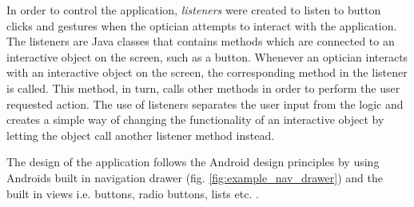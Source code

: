 \documentclass[12pt,a4paper,notitlepage]{report}
\begin{document}
In order to control the application, \textit{listeners} were created to listen to button clicks and gestures when the optician attempts to interact with the application. The listeners are Java classes that contains methods which are connected to an interactive object on the screen, such as a button. Whenever an optician interacts with an interactive object on the screen, the corresponding method in the listener is called. This method, in turn, calls other methods in order to perform the user requested action. The use of listeners separates the user input from the logic and creates a simple way of changing the functionality of an interactive object by letting the object call another listener method instead.

The design of the application follows the Android design principles by using Androids built in navigation drawer (fig. \ref{fig:example_nav_drawer}) and the built in views i.e. buttons, radio buttons, lists etc. \cite{android_design}.
\end{document}
